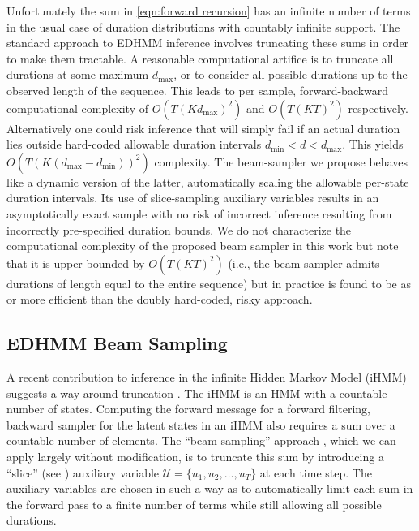 Unfortunately the sum in \eqref{eqn:forward recursion} has an infinite number of terms in the usual case of  duration distributions with countably infinite support. The standard approach to EDHMM inference involves truncating these sums in order to make them tractable. 
A reasonable computational artifice is to truncate all durations at some maximum $d_\mathrm{max}$, or to consider all possible durations up to the observed length of the sequence. This leads to per sample, forward-backward computational complexity of $O(T(Kd_\mathrm{max})^2)$  and  $O(T(KT)^2)$ respectively.  Alternatively one could risk inference that will simply fail if an actual duration lies outside hard-coded allowable duration intervals $d_\mathrm{min}<d<d_\mathrm{max}$.  This yields $O(T(K(d_\mathrm{max}-d_\mathrm{min}))^2)$ complexity.
The beam-sampler we propose behaves like a dynamic version of the latter, automatically scaling the allowable per-state duration intervals.   Its use of slice-sampling auxiliary variables results in an asymptotically exact sample with no risk of incorrect inference resulting from incorrectly pre-specified duration bounds.   We do not characterize the computational complexity of the proposed beam sampler in this work but note that it is upper bounded by $O(T(KT)^2)$ (i.e., the beam sampler admits durations of length equal to the entire sequence) but in practice is found to be as  or more efficient than the doubly hard-coded, risky approach.


\subsection{EDHMM Beam Sampling}

A recent contribution to inference 
in 
the infinite Hidden Markov Model (iHMM) \cite{Beal2002} suggests a way around truncation \cite{vanGael2008}.  The iHMM is an HMM with a countable number of states.  Computing the forward message for a forward filtering, backward sampler for the latent states in an iHMM also requires a sum over a countable number of elements.  
The ``beam sampling'' approach  \cite{vanGael2008}, which we can apply largely without modification, is to truncate this sum by introducing a ``slice''  (see \cite{Neal2003}) auxiliary variable $\mathcal{U} = \{u_1, u_2, \ldots,u_T\}$ at each time step.  The auxiliary variables are chosen in such a way as to automatically limit each sum in the forward pass to a finite number of terms while still allowing all possible durations.%

